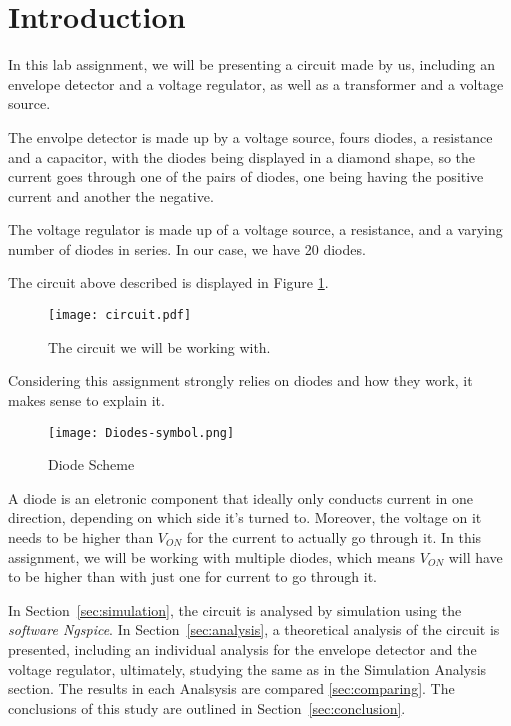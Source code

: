 \newpage
\section{Introduction}
\label{sec:introduction}

In this lab assignment, we will be presenting a circuit made by us, including an envelope detector and a voltage regulator, as well as a transformer and a voltage source.

The envolpe detector is made up by a voltage source, fours diodes, a resistance and a capacitor, with the diodes being displayed in a diamond shape, so the current goes through one of the pairs of diodes, one being having the positive current and another the negative.

The voltage regulator is made up of a voltage source, a resistance, and a varying number of diodes in series. In our case, we have 20 diodes.

The circuit above described is displayed in Figure \ref{fig:circuit}.

\begin{figure}[h] \centering
\texttt{[image: circuit.pdf]}
\caption{The circuit we will be working with.}
\label{fig:circuit}
\end{figure}

Considering this assignment strongly relies on diodes and how they work, it makes sense to explain it.

\begin{figure}[h] \centering
\texttt{[image: Diodes-symbol.png]}
\caption{Diode Scheme \cite{diode-image}}
\label{fig:diode}
\end{figure}

A diode is an eletronic component that ideally only conducts current in one direction, depending on which side it's turned to. Moreover, the voltage on it needs to be higher than $V_{ON}$ for the current to actually go through it. In this assignment, we will be working with multiple diodes, which means $V_{ON}$ will have to be higher than with just one for current to go through it.

In Section~\ref{sec:simulation}, the circuit is analysed by
simulation using the \textit{software Ngspice}. In Section~\ref{sec:analysis}, a theoretical analysis of the circuit is
presented, including an individual analysis for the envelope detector and the voltage regulator, ultimately, studying the same as in the Simulation Analysis section.
The results in each Analsysis are compared \ref{sec:comparing}.
The conclusions of this study are outlined in
Section~\ref{sec:conclusion}.
